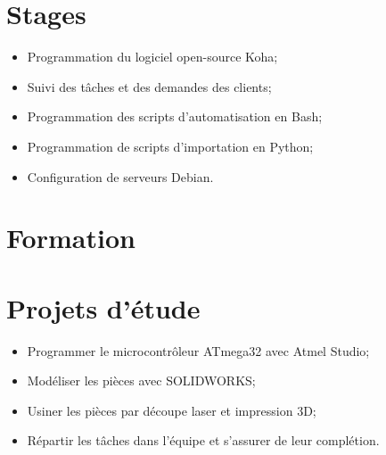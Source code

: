 \documentclass[11pt,letterpaper,sans]{moderncv}        %
\begin{document}
\makecvtitle

\section{Stages}
{%
\begin{itemize}
 \item Programmation du logiciel open-source Koha;%
 \item Suivi des tâches et des demandes des clients;%
 \item Programmation des scripts d'automatisation en Bash;%
 \item Programmation de scripts d'importation en Python;%
 \item Configuration de serveurs Debian.%
\end{itemize}}


\section{Formation}


\section{Projets d'étude}
{%
\begin{itemize}%
 \item Programmer le microcontrôleur ATmega32 avec Atmel Studio;%
 \item Modéliser les pièces avec SOLIDWORKS;%
 \item Usiner les pièces par découpe laser et impression 3D;%
 \item Répartir les tâches dans l'équipe et s'assurer de leur complétion.%
\end{itemize}}
\end{document}
